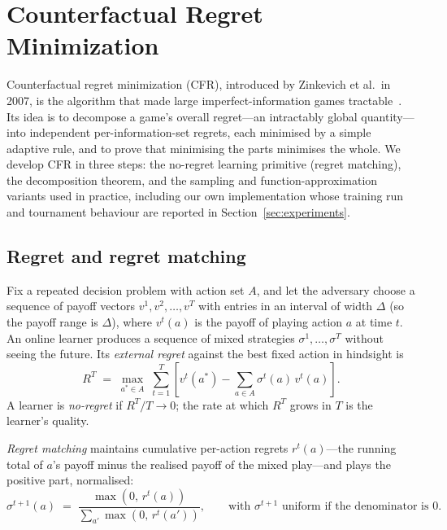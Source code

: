\section{Counterfactual Regret Minimization}\label{sec:cfr}


Counterfactual regret minimization (CFR), introduced by Zinkevich et al.~in 2007, is the algorithm that made large imperfect-information games tractable~\cite{zinkevich2007regret}. Its idea is to decompose a game's overall regret---an intractably global quantity---into independent per-information-set regrets, each minimised by a simple adaptive rule, and to prove that minimising the parts minimises the whole. We develop CFR in three steps: the no-regret learning primitive (regret matching), the decomposition theorem, and the sampling and function-approximation variants used in practice, including our own implementation whose training run and tournament behaviour are reported in Section~\ref{sec:experiments}.

\subsection{Regret and regret matching}

Fix a repeated decision problem with action set $A$, and let the adversary choose a sequence of payoff vectors $v^1, v^2, \dots, v^T$ with entries in an interval of width $\Delta$ (so the payoff range is $\Delta$), where $v^t(a)$ is the payoff of playing action $a$ at time $t$. An online learner produces a sequence of mixed strategies $\sigma^1, \dots, \sigma^T$ without seeing the future. Its \emph{external regret} against the best fixed action in hindsight is
\begin{equation}\label{eq:regretdef}
R^{T} \;=\; \max_{a^{*} \in A}\; \sum_{t=1}^{T} \left[ v^{t}(a^{*}) - \sum_{a \in A} \sigma^{t}(a)\, v^{t}(a) \right].
\end{equation}
A learner is \emph{no-regret} if $R^{T}/T \to 0$; the rate at which $R^T$ grows in $T$ is the learner's quality.

\emph{Regret matching} maintains cumulative per-action regrets $r^{t}(a)$---the running total of $a$'s payoff minus the realised payoff of the mixed play---and plays the positive part, normalised:
\begin{equation}\label{eq:rm}
\sigma^{t+1}(a) \;=\; \frac{\max(0,\, r^{t}(a))}{\sum_{a'} \max(0,\, r^{t}(a'))},
\qquad\text{with } \sigma^{t+1} \text{ uniform if the denominator is } 0.
\end{equation}

